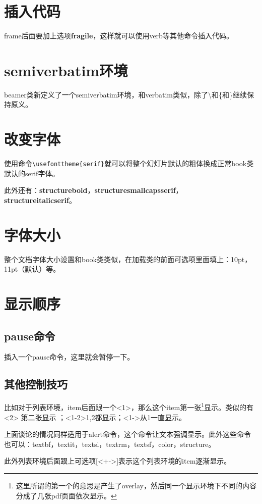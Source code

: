 \documentclass[11pt,oneside]{book}
\begin{document}
\begin{common-format}
\section{插入代码}
frame后面要加上选项\textbf{fragile}，这样就可以使用verb等其他命令插入代码。

\section{semiverbatim环境}
beamer类新定义了一个semiverbatim环境，和verbatim类似，除了\textbackslash 和\{和\}继续保持原义。

\section{改变字体}
使用命令\verb+\usefonttheme{serif}+就可以将整个幻灯片默认的粗体换成正常book类默认的serif字体。

此外还有：\textbf{structurebold}，\textbf{structuresmallcapsserif}，\\ \textbf{structureitalicserif}。

\section{字体大小}
整个文档字体大小设置和book类类似，在加载类的前面可选项里面填上：10pt，11pt（默认）等。

\section{显示顺序}
\subsection{pause命令}
插入一个pause命令，这里就会暂停一下。

\subsection{其他控制技巧}
比如对于列表环境，item后面跟一个<1>，那么这个item第一张\footnote{这里所谓的第一个的意思是产生了overlay，然后同一个显示环境下不同的内容分成了几张pdf页面依次显示。}显示。类似的有<2> 第二张显示 ；<1-2>1,2都显示；<1->从1一直显示。

上面谈论的情况同样适用于alert命令，这个命令让文本强调显示。此外这些命令也可以：textbf，textit，textsl，textrm，textsf，color，structure。

此外列表环境后面跟上可选项[<+->]表示这个列表环境的item逐渐显示。


\end{common-format}
\end{document}
